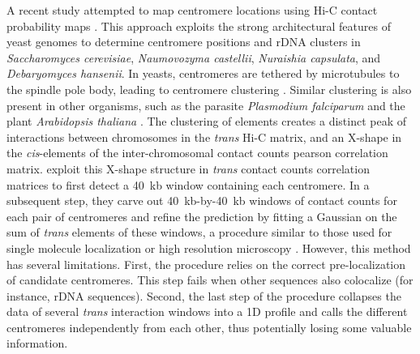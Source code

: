 A recent study attempted to map centromere locations using Hi-C contact
probability maps \citep{marie-nelly:filling}. This approach exploits the
strong architectural features of yeast genomes to determine centromere
positions and rDNA clusters in \textit{Saccharomyces cerevisiae},
\textit{Naumovozyma castellii}, \textit{Nuraishia capsulata}, and
\textit{Debaryomyces hansenii}. 
In yeasts, centromeres are tethered by microtubules to the spindle
pole body, leading to centromere clustering \citep{mizuguchi:cohesin-dependent}.
Similar clustering is also present in other organisms, such as the
parasite \textit{Plasmodium falciparum} and the plant
\textit{Arabidopsis thaliana} \citep{ay:three-dimensional,
  feng:genome-wide}.
The clustering of elements creates a
distinct peak of interactions between chromosomes in the \textit{trans} Hi-C
matrix, and an X-shape in the \textit{cis}-elements of the inter-chromosomal
contact counts pearson correlation matrix.
\citet{marie-nelly:filling} exploit this
X-shape structure in \textit{trans} contact counts correlation
matrices to first detect a 40~kb window containing each centromere.
In a subsequent step,
they carve out 40~kb-by-40~kb windows of contact counts
for each pair of centromeres and refine
the prediction by fitting a Gaussian on the sum of \textit{trans} elements of
these windows, a procedure similar to those used for single molecule
localization or high resolution microscopy \citep{Ober:localization}. However,
this method has several limitations. First, the procedure relies on the
correct pre-localization of candidate centromeres. This step fails when other
sequences also colocalize (for instance, rDNA sequences). Second, the last
step of the procedure collapses the data of several \textit{trans} interaction
windows into a 1D profile and calls the different centromeres independently
from each other, thus potentially losing some valuable information.

